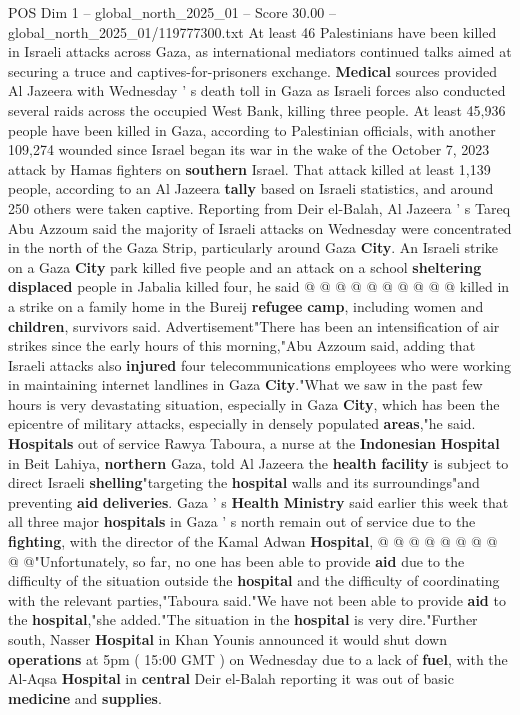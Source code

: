 \begin{textsample}{POS Dim 1 – global\_north\_2025\_01 – Score 30.00 – global\_north\_2025\_01/119777300.txt}  \label{ex:f1_pos_369}
At least 46 Palestinians have been killed in Israeli attacks across Gaza, as international mediators continued talks aimed at securing a truce and captives-for-prisoners exchange. \textbf{Medical} sources provided Al Jazeera with Wednesday ' s death toll in Gaza as Israeli forces also conducted several raids across the occupied West Bank, killing three people.
At least 45,936 people have been killed in Gaza, according to Palestinian officials, with another 109,274 wounded since Israel began its war in the wake of the October 7, 2023 attack by Hamas fighters on \textbf{southern} Israel.
That attack killed at least 1,139 people, according to an Al Jazeera \textbf{tally} based on Israeli statistics, and around 250 others were taken captive.
Reporting from Deir el-Balah, Al Jazeera ' s Tareq Abu Azzoum said the majority of Israeli attacks on Wednesday were concentrated in the north of the Gaza Strip, particularly around Gaza \textbf{City}.
An Israeli strike on a Gaza \textbf{City} park killed five people and an attack on a school \textbf{sheltering} \textbf{displaced} people in Jabalia killed four, he said @ @ @ @ @ @ @ @ @ @ killed in a strike on a family home in the Bureij \textbf{refugee} \textbf{camp}, including women and \textbf{children}, survivors said.
Advertisement"There has been an intensification of air strikes since the early hours of this morning,"Abu Azzoum said, adding that Israeli attacks also \textbf{injured} four telecommunications employees who were working in maintaining internet landlines in Gaza \textbf{City}."What we saw in the past few hours is very devastating situation, especially in Gaza \textbf{City}, which has been the epicentre of military attacks, especially in densely populated \textbf{areas},"he said. \textbf{Hospitals} out of service Rawya Taboura, a nurse at the \textbf{Indonesian} \textbf{Hospital} in Beit Lahiya, \textbf{northern} Gaza, told Al Jazeera the \textbf{health} \textbf{facility} is subject to direct Israeli \textbf{shelling}"targeting the \textbf{hospital} walls and its surroundings"and preventing \textbf{aid} \textbf{deliveries}.
Gaza ' s \textbf{Health} \textbf{Ministry} said earlier this week that all three major \textbf{hospitals} in Gaza ' s north remain out of service due to the \textbf{fighting}, with the director of the Kamal Adwan \textbf{Hospital}, @ @ @ @ @ @ @ @ @ @"Unfortunately, so far, no one has been able to provide \textbf{aid} due to the difficulty of the situation outside the \textbf{hospital} and the difficulty of coordinating with the relevant parties,"Taboura said."We have not been able to provide \textbf{aid} to the \textbf{hospital},"she added."The situation in the \textbf{hospital} is very dire."Further south, Nasser \textbf{Hospital} in Khan Younis announced it would shut down \textbf{operations} at 5pm ( 15:00 GMT ) on Wednesday due to a lack of \textbf{fuel}, with the Al-Aqsa \textbf{Hospital} in \textbf{central} Deir el-Balah reporting it was out of basic \textbf{medicine} and \textbf{supplies}.

\end{textsample}
